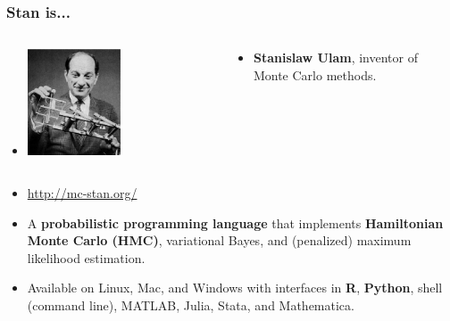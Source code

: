 \documentclass[xcolor=dvipsnames]{beamer}
\begin{document}
\begin{frame}
\frametitle{Stan is...}

\begin{columns}[c]
 \begin{column}[c]{0.5\textwidth}

\begin{itemize}
\item[]
\begin{center}
\includegraphics[width=0.5\textwidth]{stan.jpg}
\end{center}
\end{itemize}
\end{column}

\begin{column}[c]{0.5\textwidth}
\begin{itemize}
\item[] \textbf{Stanislaw Ulam}, inventor of Monte Carlo methods.\\
\end{itemize}
\end{column}
\end{columns}

\vspace{0.2cm}

\begin{itemize}
\item[] \url{http://mc-stan.org/}

\vspace{0.2cm}

\item[] A \textbf{probabilistic programming language} that implements {\color{red}\textbf{Hamiltonian Monte Carlo (HMC)}}, variational Bayes, and (penalized) maximum likelihood estimation.\\

\vspace{0.2cm}

\item[] Available on Linux, Mac, and Windows with interfaces in \textbf{R}, \textbf{Python}, shell (command line), MATLAB, Julia, Stata, and Mathematica.

\end{itemize}
\end{frame}
\end{document}
